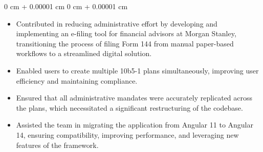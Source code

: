 \documentclass[30pt, a4paper]{article}
\newenvironment{highlights}{
    \begin{itemize}[
        topsep=0.10 cm,
        parsep=0.10 cm,
        partopsep=0pt,
        itemsep=0pt,
        leftmargin=0 cm + 10pt
    ]
}{
    \end{itemize}
} %
\newenvironment{onecolentry}{
    \begin{adjustwidth}{
        0 cm + 0.00001 cm
    }{
        0 cm + 0.00001 cm
    }
}{
    \end{adjustwidth}
} %
\newenvironment{twocolentry}[2][]{
    \onecolentry
    \def\secondColumn{#2}
    \setcolumnwidth{\fill, 4.5 cm}
    \begin{paracol}{2}
}{
    \switchcolumn \raggedleft \secondColumn
    \end{paracol}
    \endonecolentry
} %
\begin{document}
        \vspace{0.10 cm}
        \begin{onecolentry}
            \begin{highlights}
                \item Contributed in reducing administrative effort by developing and implementing an e-filing tool for financial advisors at Morgan Stanley, transitioning the process of filing Form 144 from manual paper-based workflows to a streamlined digital solution.
                \item Enabled users to create multiple 10b5-1 plans simultaneously, improving user efficiency and maintaining compliance.
                \item Ensured that all administrative mandates were accurately replicated across the plans, which necessitated a significant restructuring of the codebase.  
                \item Assisted the team in migrating the application from Angular 11 to Angular 14, ensuring compatibility, improving performance, and leveraging new features of the framework.
            \end{highlights}
        \end{onecolentry}
        

\end{document}
